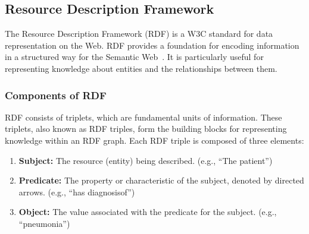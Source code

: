 \documentclass[runningheads]{llncs}
\begin{document}

\subsection{Resource Description Framework}\label{rdfintro}

The Resource Description Framework (RDF) is a W3C standard for data representation on the Web. RDF provides a foundation for encoding information in a structured way for the Semantic Web~\cite{RDF}. It is particularly useful for representing knowledge about entities and the relationships between them.


\subsubsection{Components of RDF}

RDF consists of triplets, which are fundamental units of information. These triplets, also known as RDF triples, form the building blocks for representing knowledge within an RDF graph. Each RDF triple is composed of three elements:

\begin{enumerate}
  \item \textbf{Subject:} The resource (entity) being described. (e.g., ``The patient'')
  \item \textbf{Predicate:} The property or characteristic of the subject, denoted by directed arrows. (e.g., ``has diagnosisof'')
  \item \textbf{Object:} The value associated with the predicate for the subject. (e.g., ``pneumonia'')
\end{enumerate}
\end{document}
